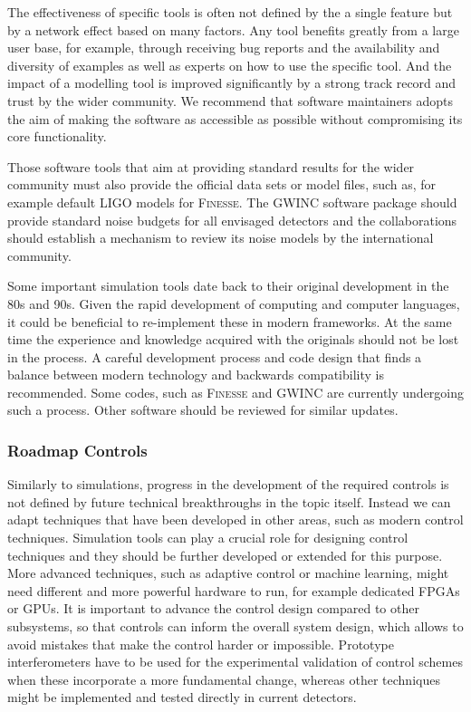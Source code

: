 The effectiveness of specific tools is often not defined by the a single feature but by a network effect based on many factors. Any tool benefits greatly from a large user base, for example, through receiving bug reports and the availability and diversity of examples as well as experts on how to use the specific tool. And the impact of a modelling tool is improved significantly by a strong track record and trust by the wider community. We recommend that software maintainers adopts the aim of making the software as accessible as possible without compromising its core functionality. %

Those software tools that aim at providing standard results for the wider community must also provide the official data sets or model files, such as, for example default LIGO models for \textsc{Finesse}. The GWINC software package should provide standard noise budgets for all envisaged detectors and the
collaborations should establish a mechanism to review its noise models by the international community.

Some important simulation tools date back to their original development in the 80s and 90s. Given the rapid development of computing and computer languages, it could be beneficial to re-implement these in modern frameworks. At the same time the experience and knowledge acquired with the originals should not be lost in the process. A careful development process and code design that finds a balance between modern technology and backwards compatibility
is recommended. Some codes, such as \textsc{Finesse} and GWINC are currently undergoing such a process. Other software should be reviewed for similar updates.

\subsubsection{Roadmap Controls}
Similarly to simulations, progress in the development of the required controls is not defined by future technical breakthroughs in the topic itself. Instead we can adapt techniques that have been developed in other areas, such as modern control techniques. Simulation tools can play a crucial role for designing control techniques and they should be further developed or extended for this purpose.
More advanced techniques, such as adaptive control or machine learning, might need different and more powerful hardware to run, for example dedicated FPGAs or GPUs. 
It is important to advance the control design compared to other subsystems, so that controls can inform the overall system design, which allows to avoid mistakes that make the control harder or impossible. Prototype interferometers have to be used for the experimental validation of control schemes when these incorporate a more fundamental change, whereas other techniques might be implemented and tested directly in current detectors.


